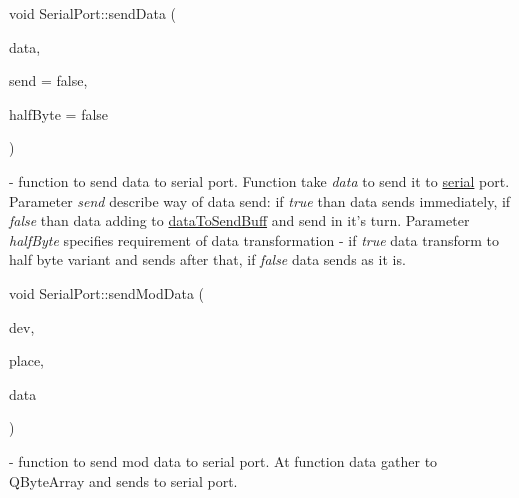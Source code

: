 \mbox{\label{classSerialPort_a2616700b4daafeb521f222e7d846dc99}} 
{\footnotesize\ttfamily void Serial\+Port\+::\texorpdfstring{send\+Data}{sendData} (\begin{DoxyParamCaption}\item[{Q\+Byte\+Array}]{data,  }\item[{bool}]{send = {\ttfamily false},  }\item[{bool}]{half\+Byte = {\ttfamily false} }\end{DoxyParamCaption})\hspace{0.3cm}{\ttfamily [slot]}} - function to send data to serial port. Function take \textit{data} to send it to \hyperlink{classSerialPort_a54120d9040537e637eae7e8c048dec31}{serial} port. Parameter \textit{send} describe way of data send: if \textit{true} than data sends immediately, if \textit{false} than data adding to \hyperlink{classSerialPort_abc55095109004eb5e21e923c25036549}{data\+To\+Send\+Buff} and send in it's turn. Parameter \textit{half\+Byte} specifies 	 requirement of data transformation - if \textit{true} data transform to half byte variant and sends after that, if \textit{false} data sends as it is.

\mbox{\label{classSerialPort_a412616b006e1b16efaf6ffd480cb9cc0}} 
{\footnotesize\ttfamily void Serial\+Port\+::\texorpdfstring{send\+Mod\+Data}{sendModData} (\begin{DoxyParamCaption}\item[{\mbox{\hyperlink{settings_8h_a48091a1e52849b0871df2f7081be2e38}{uint8\+\_\+t}}}]{dev,  }\item[{\mbox{\hyperlink{settings_8h_a48091a1e52849b0871df2f7081be2e38}{uint8\+\_\+t}}}]{place,  }\item[{\mbox{\hyperlink{settings_8h_a017dd44e68049ffdd31500a8cd01ba68}{uint16\+\_\+t}}}]{data }\end{DoxyParamCaption})\hspace{0.3cm}{\ttfamily [slot]}} - function to send mod data to serial port. At function data gather to Q\+Byte\+Array and sends to serial port.

